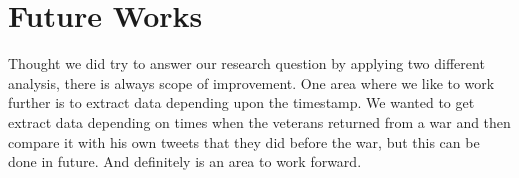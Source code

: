 \section{Future Works}

Thought we did try to answer our research question by applying two different analysis, there is always scope of improvement. One area where we like to work further is to extract data depending upon the timestamp. We wanted to get extract data depending on times when the veterans returned from a war and then compare it with his own tweets that they did before the war, but this can be done in future. And definitely is an area to work forward.
